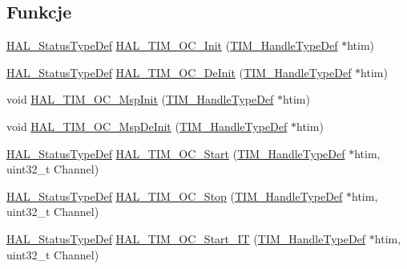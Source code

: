 \subsection*{Funkcje}
\begin{DoxyCompactItemize}
\item 
\hyperlink{stm32f4xx__hal__def_8h_a63c0679d1cb8b8c684fbb0632743478f}{H\+A\+L\+\_\+\+Status\+Type\+Def} \hyperlink{group___t_i_m___exported___functions___group2_ga7541c3db71ec7c0b4b54afa473bdb19a}{H\+A\+L\+\_\+\+T\+I\+M\+\_\+\+O\+C\+\_\+\+Init} (\hyperlink{struct_t_i_m___handle_type_def}{T\+I\+M\+\_\+\+Handle\+Type\+Def} $\ast$htim)
\item 
\hyperlink{stm32f4xx__hal__def_8h_a63c0679d1cb8b8c684fbb0632743478f}{H\+A\+L\+\_\+\+Status\+Type\+Def} \hyperlink{group___t_i_m___exported___functions___group2_ga79f0c3e3015a81c535a578edc2fee8ca}{H\+A\+L\+\_\+\+T\+I\+M\+\_\+\+O\+C\+\_\+\+De\+Init} (\hyperlink{struct_t_i_m___handle_type_def}{T\+I\+M\+\_\+\+Handle\+Type\+Def} $\ast$htim)
\item 
void \hyperlink{group___t_i_m___exported___functions___group2_gab7ea7555b79c4544ad90dc6d063d2f13}{H\+A\+L\+\_\+\+T\+I\+M\+\_\+\+O\+C\+\_\+\+Msp\+Init} (\hyperlink{struct_t_i_m___handle_type_def}{T\+I\+M\+\_\+\+Handle\+Type\+Def} $\ast$htim)
\item 
void \hyperlink{group___t_i_m___exported___functions___group2_ga2f01705566708fcaceb32bcad01f7498}{H\+A\+L\+\_\+\+T\+I\+M\+\_\+\+O\+C\+\_\+\+Msp\+De\+Init} (\hyperlink{struct_t_i_m___handle_type_def}{T\+I\+M\+\_\+\+Handle\+Type\+Def} $\ast$htim)
\item 
\hyperlink{stm32f4xx__hal__def_8h_a63c0679d1cb8b8c684fbb0632743478f}{H\+A\+L\+\_\+\+Status\+Type\+Def} \hyperlink{group___t_i_m___exported___functions___group2_ga5dbbafc75b341b79d29bc41f8ec15492}{H\+A\+L\+\_\+\+T\+I\+M\+\_\+\+O\+C\+\_\+\+Start} (\hyperlink{struct_t_i_m___handle_type_def}{T\+I\+M\+\_\+\+Handle\+Type\+Def} $\ast$htim, uint32\+\_\+t Channel)
\item 
\hyperlink{stm32f4xx__hal__def_8h_a63c0679d1cb8b8c684fbb0632743478f}{H\+A\+L\+\_\+\+Status\+Type\+Def} \hyperlink{group___t_i_m___exported___functions___group2_ga9cb1f62afb99aea0db8cc28b378b68ad}{H\+A\+L\+\_\+\+T\+I\+M\+\_\+\+O\+C\+\_\+\+Stop} (\hyperlink{struct_t_i_m___handle_type_def}{T\+I\+M\+\_\+\+Handle\+Type\+Def} $\ast$htim, uint32\+\_\+t Channel)
\item 
\hyperlink{stm32f4xx__hal__def_8h_a63c0679d1cb8b8c684fbb0632743478f}{H\+A\+L\+\_\+\+Status\+Type\+Def} \hyperlink{group___t_i_m___exported___functions___group2_gad3116f3b344392f7b947ff1218ba9ed8}{H\+A\+L\+\_\+\+T\+I\+M\+\_\+\+O\+C\+\_\+\+Start\+\_\+\+IT} (\hyperlink{struct_t_i_m___handle_type_def}{T\+I\+M\+\_\+\+Handle\+Type\+Def} $\ast$htim, uint32\+\_\+t Channel)

\end{DoxyCompactItemize}
